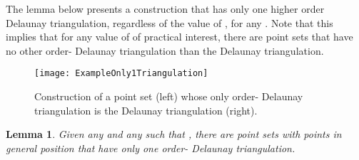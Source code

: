 \documentclass {journal}
\newtheorem {lemma} {Lemma}
\newcommand {\hodt}{higher order Delaunay triangulation}
\begin{document}
The lemma below presents a construction that has only one \hodt, regardless of the value of , for any .
Note that this implies that for any value of  of practical interest, there are point sets that have no other order- Delaunay triangulation than the Delaunay triangulation.

\begin{figure}[tb]
\centering
\texttt{[image: ExampleOnly1Triangulation]}
\caption{Construction of a point set (left) whose only order- Delaunay triangulation is the Delaunay triangulation (right).}
\label{fig:ExampleOnly1Triangulation}
\end{figure}

\begin{lemma}
\label{lem:Only1}
Given any  and any  such that , there are point sets with  points in general position that have only one order- Delaunay triangulation.
\end{lemma}
\end{document}
